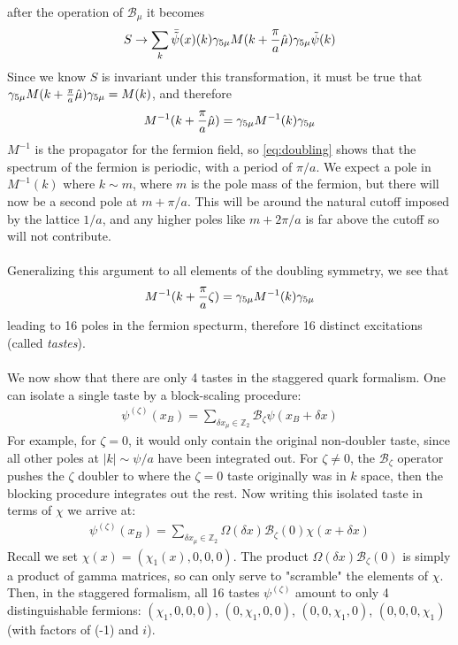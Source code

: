 after the operation of $\mathcal{B}_{\mu}$ it becomes
\begin{align}
	S \to \sum_k \bar{\tilde{\psi}}(x)(k) \gamma_{5\mu} M(k+{\pi\over a}\hat{\mu})\gamma_{5\mu} \tilde{\psi}(k)
\end{align}
Since we know $S$ is invariant under this transformation, it must be true that $\gamma_{5\mu} M(k+{\pi\over a}\hat{\mu})\gamma_{5\mu} = M(k)$, and therefore
\begin{align}
	M^{-1}(k+{\pi\over a}\hat{\mu}) = \gamma_{5\mu} M^{-1}(k) \gamma_{5\mu}
	\label{eq:doubling}
\end{align}
$M^{-1}$ is the propagator for the fermion field, so \ref{eq:doubling} shows that the spectrum of the fermion is periodic, with a period of $\pi/a$. We expect a pole in $M^{-1}(k)$ where $k \sim m$, where $m$ is the pole mass of the fermion, but there will now be a second pole at $m + \pi/a$. This will be around the natural cutoff imposed by the lattice $1/a$, and any higher poles like $m+2\pi/a$ is far above the cutoff so will not contribute.  
\\ \\
Generalizing this argument to all elements of the doubling symmetry, we see that
\begin{align}
	M^{-1}(k+{\pi\over a}\zeta) = \gamma_{5\mu} M^{-1}(k) \gamma_{5\mu}
\end{align}
leading to 16 poles in the fermion specturm, therefore 16 distinct excitations (called \textit{tastes}).
\\ \\
We now show that there are only 4 tastes in the staggered quark formalism. 
One can isolate a single taste by a block-scaling procedure:
\begin{align}
	\psi^{(\zeta)}(x_B) = \sum_{\delta x_{\mu} \in \mathbb{Z}_2} \mathcal{B}_{\zeta} \psi(x_B + \delta x)
\end{align}
For example, for $\zeta = 0$, it would only contain the original non-doubler taste, since all other poles at $|k|\sim\psi/a$ have been integrated out. For $\zeta \neq 0$, the $\mathcal{B}_{\zeta}$ operator pushes the $\zeta$ doubler to where the $\zeta=0$ taste originally was in $k$ space, then the blocking procedure integrates out the rest. Now writing this isolated taste in terms of $\chi$ we arrive at:
\begin{align}
	\psi^{(\zeta)}(x_B) = \sum_{\delta x_{\mu} \in \mathbb{Z}_2} \Omega(\delta x) \mathcal{B}_{\zeta}(0) \chi(x+\delta x)
\end{align} 
Recall we set $\chi(x) = (\chi_1(x),0,0,0)$. The product $\Omega(\delta x) \mathcal{B}_{\zeta}(0)$ is simply a product of gamma matrices, so can only serve to "scramble" the elements of $\chi$. Then, in the staggered formalism, all 16 tastes $\psi^{(\zeta)}$ amount to only 4 distinguishable fermions: $(\chi_1,0,0,0)$, $(0,\chi_1,0,0)$, $(0,0,\chi_1,0)$, $(0,0,0,\chi_1)$ (with factors of (-1) and $i$).


